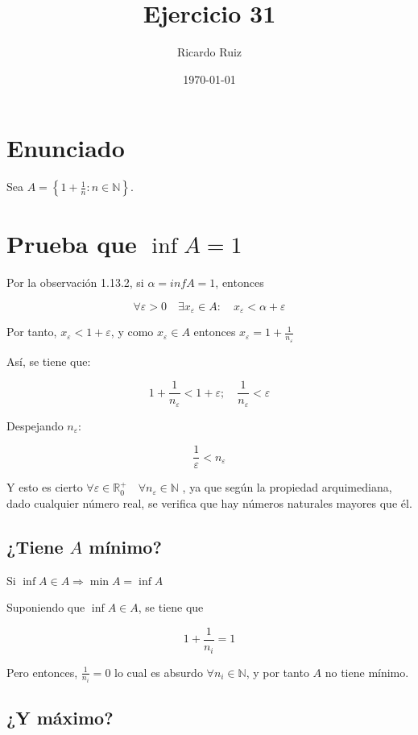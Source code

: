 \documentclass[11pt]{article}
\author{Ricardo Ruiz}
\date{\today}
\title{Ejercicio 31}
\theoremstyle{plain}
\theoremstyle{definition}
\theoremstyle{remark}
\begin{document}
\maketitle

\section{Enunciado}
\label{sec-1}

Sea \(A = \left\{ 1 + \frac{1}{n}: n \in \mathbb{N} \right\}\). 

\section{Prueba que \(\inf A = 1\)}
\label{sec-2}

Por la observación 1.13.2, si $\alpha = inf A = 1$, entonces

\[
\forall \varepsilon > 0 \quad \exists x_\varepsilon \in A: \quad  x_\varepsilon < \alpha + \varepsilon
\]

Por tanto, \(x_\varepsilon < 1 + \varepsilon\), y como
\(x_\varepsilon \in A\) entonces \(x_\varepsilon = 1 + \frac{1}{n_\varepsilon}\)

Así, se tiene que:

\[
1 + \frac{1}{n_\varepsilon} < 1 + \varepsilon; \quad 
\frac{1}{n_\varepsilon} < \varepsilon
\]

Despejando \(n_\varepsilon\):

\[ \frac{1}{\varepsilon} < n_\varepsilon \]

Y esto es cierto \(\forall \varepsilon \in \mathbb{R}_0^+ \quad \forall n_\varepsilon \in \mathbb{N}\) , ya que según la propiedad arquimediana,
dado cualquier número real, se verifica que hay números naturales mayores que él.

\subsection{¿Tiene \(A\) mínimo?}
\label{sec-2-1}

Si \(\inf A \in A \Rightarrow \min A = \inf A\)

Suponiendo que \(\inf A \in A\), se tiene que

\[ 1 + \frac{1}{n_i} = 1\]

Pero entonces, \(\frac{1}{n_i} = 0\) lo cual es absurdo \(\forall n_i \in \mathbb{N}\), y por tanto $A$ no tiene mínimo.

\subsection{¿Y máximo?}
\label{sec-2-2}
\end{document}
